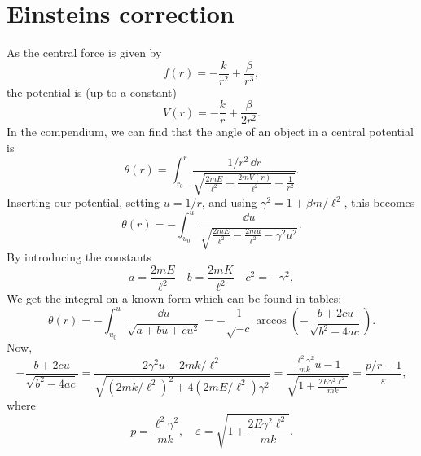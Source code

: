 \documentclass{article}
\begin{document}
    \section{Einsteins correction}
        As the central force is given by
        \begin{equation*}
            f(r) = - \frac{k}{r^2} + \frac{\beta}{r^3},
        \end{equation*}
        the potential is (up to a constant)
        \begin{equation*}
            V(r) = - \frac{k}{r} + \frac{\beta}{2 r^2}.
        \end{equation*}
        In the compendium, we can find that the angle of an object in a central potential is
        \begin{equation*}
            \theta(r) = \int_{r_0}^r \frac{1 / r^2 \, \dd r}{\sqrt{\frac{2 m E}{\ell^2} - \frac{2 m V(r)}{\ell^2} - \frac{1}{r^2}}}.
        \end{equation*}
        Inserting our potential, setting $u = 1/r$, and using $\gamma^2 = 1 + \beta m / \ell^2$, this becomes
        \begin{equation*}
            \theta(r) = -\int_{u_0}^u \frac{\dd u}{\sqrt{\frac{2 m E}{\ell^2} - \frac{2 m u}{\ell^2} - \gamma^2 u^2}}.
        \end{equation*}
        By introducing the constants
        \begin{equation*}
            a = \frac{2mE}{\ell^2}\quad b = \frac{2 m K}{\ell^2} \quad c^2 = -\gamma^2,
        \end{equation*}
        We get the integral on a known form which can be found in tables:
        \begin{equation*}
            \theta(r) = -\int_{u_0}^u \frac{\dd u}{\sqrt{a + b u + c u^2}} 
            = -\frac{1}{\sqrt{-c}} \arccos \left(-\frac{b + 2c u}{\sqrt{b^2 - 4 a c}}\right).
        \end{equation*}
        Now,
        \begin{equation*}
            -\frac{b + 2c u}{\sqrt{b^2 - 4 a c}} = \frac{2\gamma^2u - 2mk/\ell^2}{\sqrt{\left(2 mk/\ell^2\right)^2 + 4\left(2mE/\ell^2\right)\gamma^2}} 
            = \frac{\frac{\ell^2 \gamma^2}{mk}u - 1}{\sqrt{1 + \frac{2E\gamma^2 \ell^2}{mk}}} = \frac{p / r - 1}{\varepsilon},
        \end{equation*}
        where
        \begin{equation*}
            p = \frac{\ell^2 \gamma^2}{mk}, \quad  \varepsilon = \sqrt{1 + \frac{2E\gamma^2 \ell^2}{mk}}.
        \end{equation*}
\end{document}
